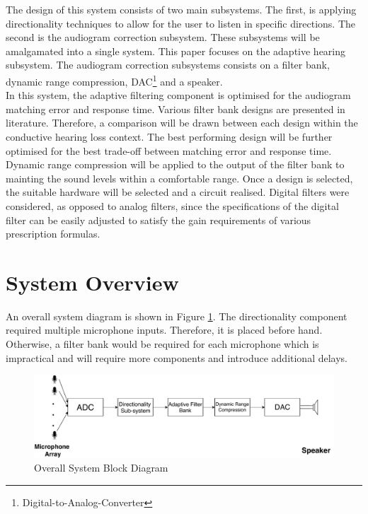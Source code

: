 \documentclass[11pt,onecolumn]{witseiepaper}
\begin{document}
\noindent The design of this system consists of two main subsystems. The first, is applying directionality techniques to allow for the user to listen in specific directions. The second is the audiogram correction subsystem. These subsystems will be amalgamated into a single system. This paper focuses on the adaptive hearing subsystem. The audiogram correction subsystems consists on a filter bank, dynamic range compression, DAC\footnote{Digital-to-Analog-Converter} and a speaker. \\
\newline
\noindent In this system, the adaptive filtering component is optimised for the audiogram matching error and response time. Various filter bank designs are presented in literature. Therefore, a comparison will be drawn between each design within the conductive hearing loss context. The best performing design will be further optimised for the best trade-off between matching error and response time. Dynamic range compression will be applied to the output of the filter bank to mainting the sound levels within a comfortable range. Once a design is selected, the suitable hardware will be selected and a circuit realised. Digital filters were considered, as opposed to analog filters, since the specifications of the digital filter can be easily adjusted to satisfy the gain requirements of various prescription formulas.


\section{System Overview}

\noindent An overall system diagram is shown in Figure \ref{fig:system}. The directionality component required multiple microphone inputs. Therefore, it is placed before hand. Otherwise, a filter bank would be required for each microphone which is impractical and will require more components and introduce additional delays.

\begin{figure}[h]
\centering
\includegraphics[width=0.9\linewidth]{system.pdf}
\caption{Overall System Block Diagram}
\label{fig:system}
\end{figure}  
\end{document}
